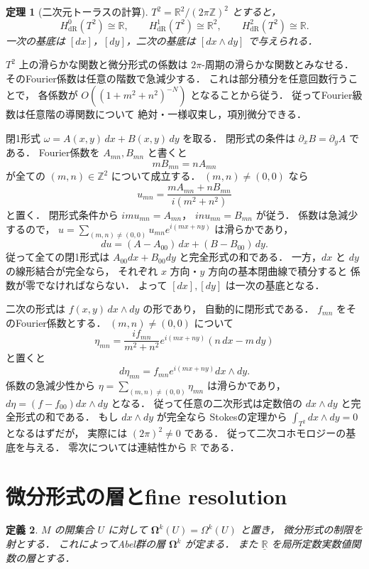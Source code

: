 \documentclass[a5paper,10pt,onecolumn]{jsarticle}
\makeatletter
\theoremstyle{mathnotetheorem}
\newtheorem{theorem}{定理}[section]
\newtheorem{definition}[theorem]{定義}
\renewcommand{\proofname}{証明}
\renewenvironment{proof}[1][\proofname]{%
  \par\pushQED{\qed}\normalfont\topsep4\p@\@plus2\p@\relax
  \trivlist\item[\hskip\labelsep\bfseries #1]\ignorespaces
}{\popQED\endtrivlist\@endpefalse}
\makeatother
\begin{document}
\begin{theorem}[二次元トーラスの計算]\label{thm:torus}
$T^2=\mathbb R^2/(2\pi\mathbb Z)^2$ とすると，
\[
 H_{\mathrm{dR}}^0(T^2)\cong\mathbb R,\qquad
 H_{\mathrm{dR}}^1(T^2)\cong\mathbb R^2,\qquad
 H_{\mathrm{dR}}^2(T^2)\cong\mathbb R.
\]
一次の基底は $[dx]$，$[dy]$，二次の基底は
$[dx\wedge dy]$ で与えられる．
\end{theorem}
\begin{proof}
$T^2$ 上の滑らかな関数と微分形式の係数は
$2\pi$-周期の滑らかな関数とみなせる．
そのFourier係数は任意の階数で急減少する．
これは部分積分を任意回数行うことで，
各係数が
$O((1+m^2+n^2)^{-N})$ となることから従う．
従ってFourier級数は任意階の導関数について
絶対・一様収束し，項別微分できる．

閉1形式 $\omega=A(x,y)\,dx+B(x,y)\,dy$ を取る．
閉形式の条件は $\partial_xB=\partial_yA$ である．
Fourier係数を $A_{mn},B_{mn}$ と書くと
\[
 mB_{mn}=nA_{mn}
\]
が全ての $(m,n)\in\mathbb Z^2$ について成立する．
$(m,n)\ne(0,0)$ なら
\[
 u_{mn}=
 \frac{mA_{mn}+nB_{mn}}{i(m^2+n^2)}
\]
と置く．
閉形式条件から
$i m u_{mn}=A_{mn}$，
$i n u_{mn}=B_{mn}$ が従う．
係数は急減少するので，
$u=\sum_{(m,n)\ne(0,0)}
 u_{mn}e^{i(mx+ny)}$ は滑らかであり，
\[
 du=(A-A_{00})\,dx+(B-B_{00})\,dy.
\]
従って全ての閉1形式は
$A_{00}dx+B_{00}dy$ と完全形式の和である．
一方，$dx$ と $dy$ の線形結合が完全なら，
それぞれ $x$ 方向・$y$ 方向の基本閉曲線で積分すると
係数が零でなければならない．
よって $[dx],[dy]$ は一次の基底となる．

二次の形式は $f(x,y)\,dx\wedge dy$ の形であり，
自動的に閉形式である．
$f_{mn}$ をそのFourier係数とする．
$(m,n)\ne(0,0)$ について
\[
 \eta_{mn}=
 \frac{i f_{mn}}{m^2+n^2}
 e^{i(mx+ny)}(n\,dx-m\,dy)
\]
と置くと
\[
 d\eta_{mn}=f_{mn}e^{i(mx+ny)}dx\wedge dy.
\]
係数の急減少性から
$\eta=\sum_{(m,n)\ne(0,0)}\eta_{mn}$ は滑らかであり，
$d\eta=(f-f_{00})dx\wedge dy$ となる．
従って任意の二次形式は定数倍の
$dx\wedge dy$ と完全形式の和である．
もし $dx\wedge dy$ が完全なら
Stokesの定理から
$\int_{T^2}dx\wedge dy=0$ となるはずだが，
実際には $(2\pi)^2\ne0$ である．
従って二次コホモロジーの基底を与える．
零次については連結性から $\mathbb R$ である．
\end{proof}

\section{微分形式の層とfine resolution}

\begin{definition}
$M$ の開集合 $U$ に対して
$\boldsymbol\Omega^k(U)=\Omega^k(U)$ と置き，
微分形式の制限を射とする．
これによってAbel群の層 $\boldsymbol\Omega^k$ が定まる．
また $\underline{\mathbb R}$ を局所定数実数値関数の層とする．
\end{definition}
\end{document}
